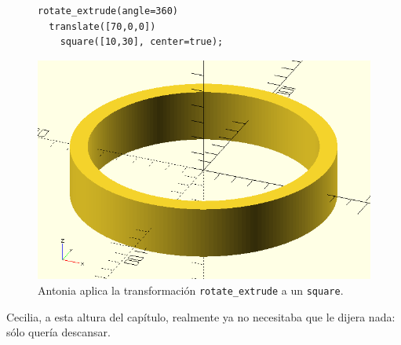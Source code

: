   \begin{figure}[h!]
  \begin{minipage}[]{.5\textwidth}%
    \begin{lstlisting}
rotate_extrude(angle=360)
  translate([70,0,0])
    square([10,30], center=true);
  \end{lstlisting}
\end{minipage}\hfill
\begin{minipage}[]{.5\textwidth}%
  \flushright
  \includegraphics[width=.9\textwidth]{imagenes/rotate-square}
\end{minipage}
\caption{Antonia aplica la transformación \lstinline!rotate_extrude! a
  un \lstinline!square!.}%
    \label{fig:rotate-square}
  \end{figure}

  
  
   Cecilia, a esta altura del capítulo, realmente ya no necesitaba que
   le dijera nada: sólo quería descansar.





